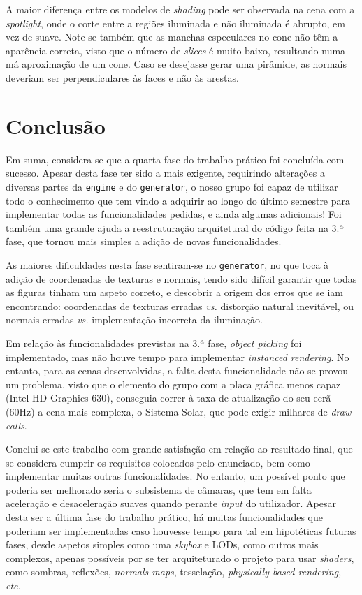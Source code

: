 \documentclass[12pt, a4paper]{article}
\begin{document}
A maior diferença entre os modelos de \emph{shading} pode ser observada na cena com a
\emph{spotlight}, onde o corte entre a regiões iluminada e não iluminada é abrupto, em vez de suave.
Note-se também que as manchas especulares no cone não têm a aparência correta, visto que o número de
\emph{slices} é muito baixo, resultando numa má aproximação de um cone. Caso se desejasse gerar uma
pirâmide, as normais deveriam ser perpendiculares às faces e não às arestas.

\section{Conclusão}

Em suma, considera-se que a quarta fase do trabalho prático foi concluída com sucesso. Apesar desta
fase ter sido a mais exigente, requirindo alterações a diversas partes da \texttt{engine} e do
\texttt{generator}, o nosso grupo foi capaz de utilizar todo o conhecimento que tem vindo a adquirir
ao longo do último semestre para implementar todas as funcionalidades pedidas, e ainda algumas
adicionais! Foi também uma grande ajuda a reestruturação arquitetural do código feita na 3.ª fase,
que tornou mais simples a adição de novas funcionalidades.

As maiores dificuldades nesta fase sentiram-se no \texttt{generator}, no que toca à adição de
coordenadas de texturas e normais, tendo sido difícil garantir que todas as figuras tinham um aspeto
correto, e descobrir a origem dos erros que se iam encontrando: coordenadas de texturas erradas
\emph{vs.} distorção natural inevitável, ou normais erradas \emph{vs.} implementação incorreta da
iluminação.

Em relação às funcionalidades previstas na 3.ª fase, \emph{object picking} foi implementado, mas não
houve tempo para implementar \emph{instanced rendering}. No entanto, para as cenas desenvolvidas, a
falta desta funcionalidade não se provou um problema, visto que o elemento do grupo com a placa
gráfica menos capaz (Intel HD Graphics 630), conseguia correr à taxa de atualização do seu ecrã
(60Hz) a cena mais complexa, o Sistema Solar, que pode exigir milhares de \emph{draw calls}.

Conclui-se este trabalho com grande satisfação em relação ao resultado final, que se considera
cumprir os requisitos colocados pelo enunciado, bem como implementar muitas outras funcionalidades.
No entanto, um possível ponto que poderia ser melhorado seria o subsistema de câmaras, que tem em
falta aceleração e desaceleração suaves quando perante \emph{input} do utilizador. Apesar desta ser
a última fase do trabalho prático, há muitas funcionalidades que poderiam ser implementadas caso
houvesse tempo para tal em hipotéticas futuras fases, desde aspetos simples como uma \emph{skybox} e
LODs, como outros mais complexos, apenas possíveis por se ter arquiteturado o projeto para usar
\emph{shaders}, como sombras, reflexões, \emph{normals maps}, tesselação, \emph{physically based
rendering}, \emph{etc.}
\end{document}
